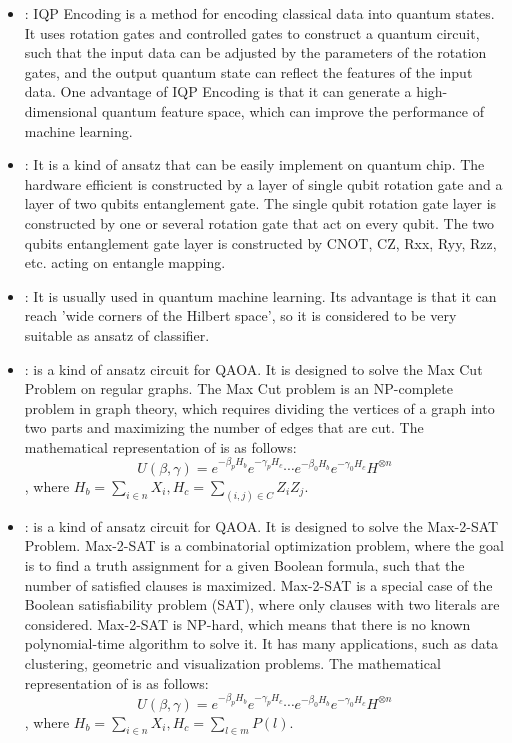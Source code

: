 \begin{itemize}
    \item \IQPEncoding: IQP Encoding is a method for encoding classical data into quantum states\cite{Havlíček2019}. It uses rotation gates and controlled gates to construct a quantum circuit, such that the input data can be adjusted by the parameters of the rotation gates, and the output quantum state can reflect the features of the input data. One advantage of IQP Encoding is that it can generate a high-dimensional quantum feature space, which can improve the performance of machine learning.

    \item \HardwareEfficientAnsatz: It is a kind of ansatz that can be easily implement on quantum chip\cite{Kandala2017}. The hardware efficient is constructed by a layer of single qubit rotation gate and a layer of two qubits entanglement gate. The single qubit rotation gate layer is constructed by one or several rotation gate that act on every qubit. The two qubits entanglement gate layer is constructed by CNOT, CZ, Rxx, Ryy, Rzz, etc. acting on entangle mapping.

    \item \StronglyEntangling: It is usually used in quantum machine learning. Its advantage is that it can reach 'wide corners of the Hilbert space'\cite{Schuld_2020}, so it is considered to be very suitable as ansatz of classifier.

    \item \MaxCutAnsatz: \MaxCutAnsatz is a kind of ansatz circuit for QAOA\cite{farhi2014quantum}. It is designed to solve the Max Cut Problem on regular graphs. The Max Cut problem is an NP-complete problem in graph theory, which requires dividing the vertices of a graph into two parts and maximizing the number of edges that are cut. The mathematical representation of \MaxCutAnsatz is as follows:
          $$U(\beta, \gamma) = e^{-\beta_pH_b}e^{-\gamma_pH_c}
              \cdots e^{-\beta_0H_b}e^{-\gamma_0H_c}H^{\otimes n}$$,
          where $H_b = \sum_{i\in n}X_{i}, H_c = \sum_{(i,j)\in C}Z_iZ_j$.

    \item \MaxToSATAnsatz: \MaxToSATAnsatz is a kind of ansatz circuit for QAOA\cite{Akshay_2020}. It is designed to solve the Max-2-SAT Problem. Max-2-SAT is a combinatorial optimization problem, where the goal is to find a truth assignment for a given Boolean formula, such that the number of satisfied clauses is maximized. Max-2-SAT is a special case of the Boolean satisfiability problem (SAT), where only clauses with two literals are considered. Max-2-SAT is NP-hard, which means that there is no known polynomial-time algorithm to solve it. It has many applications, such as data clustering, geometric and visualization problems. The mathematical representation of \MaxToSATAnsatz is as follows:
          $$U(\beta, \gamma) = e^{-\beta_pH_b}e^{-\gamma_pH_c}
              \cdots e^{-\beta_0H_b}e^{-\gamma_0H_c}H^{\otimes n}$$,
          where $H_b = \sum_{i\in n}X_{i}, H_c = \sum_{l\in m}P(l)$.


\end{itemize}
